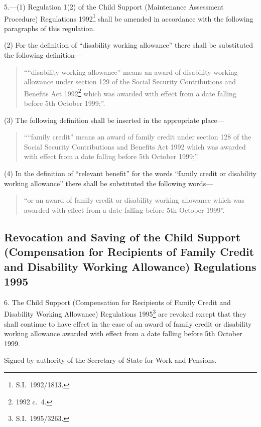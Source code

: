 \documentclass[12pt,a4paper]{article}
\begin{document}
5.---(1)  Regulation 1(2) of the Child Support (Maintenance Assessment Procedure) Regulations 1992\footnote{S.I.\ 1992/1813.} shall be amended in accordance with the following paragraphs of this regulation.

(2) For the definition of “disability working allowance” there shall be substituted the following definition—
\begin{quotation}
““disability working allowance” means an award of disability working allowance under section 129 of the Social Security Contributions and Benefits Act 1992\footnote{1992 c.\ 4.} which was awarded with effect from a date falling before 5th October 1999;”.
\end{quotation}

(3) The following definition shall be inserted in the appropriate place—
\begin{quotation}
““family credit” means an award of family credit under section 128 of the Social Security Contributions and Benefits Act 1992 which was awarded with effect from a date falling before 5th October 1999;”.
\end{quotation}

(4) In the definition of “relevant benefit” for the words “family credit or disability working allowance” there shall be substituted the following words—
\begin{quotation}
    “or an award of family credit or disability working allowance which was awarded with effect from a date falling before 5th October 1999”. 
\end{quotation}

\subsection[6. Revocation and Saving of the Child Support (Compensation for Recipients of Family Credit and Disability Working Allowance) Regulations 1995]{Revocation and Saving of the Child Support (Compensation for Recipients of Family Credit and Disability Working Allowance) Regulations 1995}

6.  The Child Support (Compensation for Recipients of Family Credit and Disability Working Allowance) Regulations 1995\footnote{S.I.\ 1995/3263.} are revoked except that they shall continue to have effect in the case of an award of family credit or disability working allowance awarded with effect from a date falling before 5th October 1999. 

\bigskip

Signed 
by authority of the Secretary of State for Work and Pensions.
\end{document}
